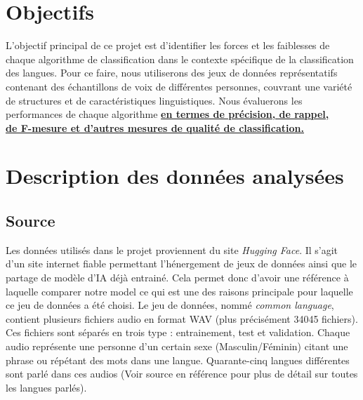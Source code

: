 \documentclass[11pt]{article}
\begin{document}



\section{Objectifs}
L'objectif principal de ce projet est d'identifier les forces et les faiblesses de chaque algorithme de classification dans le contexte spécifique de la classification des langues. Pour ce faire, nous utiliserons des jeux de données représentatifs contenant des échantillons de voix de différentes personnes, couvrant une variété de structures et de caractéristiques linguistiques. Nous évaluerons les performances de chaque algorithme \textbf{\underline{en termes de précision, de rappel,}}\\
\textbf{\underline{de F-mesure et d'autres mesures de qualité de classification.}}


\section{Description des données analysées}
\subsection{Source}
Les données utilisés dans le projet proviennent du site \textit{Hugging Face}. Il s'agit d'un site internet fiable permettant l'hénergement de jeux de données ainsi que le partage de modèle d'IA déjà entrainé. Cela permet donc d'avoir une référence à laquelle comparer notre model ce qui est une des raisons principale pour laquelle ce jeu de données a été choisi.
Le jeu de données, nommé \textit{common language}, contient plusieurs fichiers audio en format WAV (plus précisément 34045 fichiers). Ces fichiers sont séparés en trois type : entrainement, test et validation. Chaque audio représente une personne d'un certain sexe (Masculin/Féminin) citant une phrase ou répétant des mots dans une langue. Quarante-cinq langues différentes sont parlé dans ces audios (Voir source en référence pour plus de détail sur toutes les langues parlés).
\end{document}
